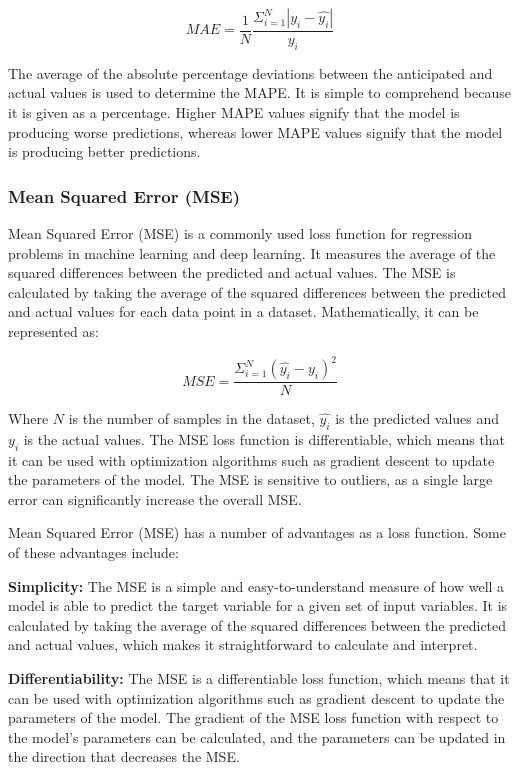 \documentclass[a4paper]{article}
\begin{document}
$$
MAE = \frac{1}{N} \frac{\Sigma_{i=1}^{N}|y_{i}-\hat{y_{i}}|}{y_{i}}
$$

The average of the absolute percentage deviations between the anticipated and actual values is used to determine the MAPE. It is simple to comprehend because it is given as a percentage. Higher MAPE values signify that the model is producing worse predictions, whereas lower MAPE values signify that the model is producing better predictions.
\subsubsection{Mean Squared Error (MSE)}
Mean Squared Error (MSE) is a commonly used loss function for regression problems in machine learning and deep learning. It measures the average of the squared differences between the predicted and actual values. The MSE is calculated by taking the average of the squared differences between the predicted and actual values for each data point in a dataset. Mathematically, it can be represented as:

$$
MSE = \frac{\Sigma_{i=1}^{N}(\hat{y_{i}}-y_{i})^2}{N}
$$

Where $N$ is the number of samples in the dataset, $\hat{y_{i}}$ is the predicted values and $y_{i}$ is the actual values. The MSE loss function is differentiable, which means that it can be used with optimization algorithms such as gradient descent to update the parameters of the model. The MSE is sensitive to outliers, as a single large error can significantly increase the overall MSE.

Mean Squared Error (MSE) has a number of advantages as a loss function. Some of these advantages include:

\textbf{Simplicity:} The MSE is a simple and easy-to-understand measure of how well a model is able to predict the target variable for a given set of input variables. It is calculated by taking the average of the squared differences between the predicted and actual values, which makes it straightforward to calculate and interpret.

\textbf{Differentiability:} The MSE is a differentiable loss function, which means that it can be used with optimization algorithms such as gradient descent to update the parameters of the model. The gradient of the MSE loss function with respect to the model's parameters can be calculated, and the parameters can be updated in the direction that decreases the MSE.
\end{document}
